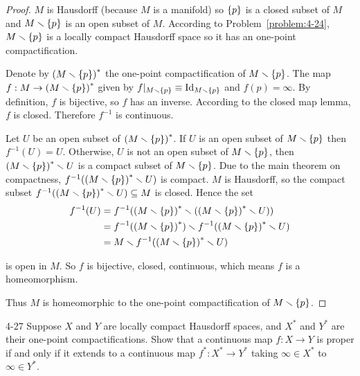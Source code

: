 \begin{proof}
	$M$ is Hausdorff (because $M$ is a manifold) so $\left\{{p}\right\}$ is a closed subset of $M$ and $M\smallsetminus \left\{{p}\right\}$ is an open subset of $M$. According to Problem~\ref{problem:4-24}, $M\smallsetminus \left\{{p}\right\}$ is a locally compact Hausdorff space so it has an one-point compactification.

	Denote by ${(M\smallsetminus \left\{{p}\right\})}^{*}$ the one-point compactification of $M\smallsetminus \left\{{p}\right\}$. The map $f: M \to {(M\smallsetminus \left\{{p}\right\})}^{*}$ given by $f\vert_{M\smallsetminus \left\{{p}\right\}} \equiv \operatorname{Id}_{M\smallsetminus \left\{{p}\right\}}$ and $f(p) = \infty$. By definition, $f$ is bijective, so $f$ has an inverse. According to the closed map lemma, $f$ is closed. Therefore $f^{-1}$ is continuous.

	Let $U$ be an open subset of ${(M\smallsetminus \left\{{p}\right\})}^{*}$. If $U$ is an open subset of $M\smallsetminus \left\{{p}\right\}$ then $f^{-1}(U) = U$. Otherwise, $U$ is not an open subset of $M\smallsetminus \left\{{p}\right\}$, then ${(M\smallsetminus \left\{{p}\right\})}^{*} \smallsetminus U$ is a compact subset of $M\smallsetminus \left\{{p}\right\}$. Due to the main theorem on compactness, $f^{-1}({(M\smallsetminus \left\{{p}\right\})}^{*} \smallsetminus U)$ is compact. $M$ is Hausdorff, so the compact subset $f^{-1}({(M\smallsetminus \left\{{p}\right\})}^{*} \smallsetminus U) \subseteq M$ is closed. Hence the set
	\begin{align*}
		f^{-1}(U) & = f^{-1}({(M\smallsetminus\left\{{p}\right\})}^{*} \smallsetminus ({(M\smallsetminus\left\{{p}\right\})}^{*} \smallsetminus U))       \\
		          & = f^{-1}({(M\smallsetminus\left\{{p}\right\})}^{*}) \smallsetminus f^{-1}({(M\smallsetminus\left\{{p}\right\})}^{*} \smallsetminus U) \\
		          & = M \smallsetminus f^{-1}({(M\smallsetminus\left\{{p}\right\})}^{*} \smallsetminus U)
	\end{align*}

	is open in $M$. So $f$ is bijective, closed, continuous, which means $f$ is a homeomorphism.

	Thus $M$ is homeomorphic to the one-point compactification of $M\smallsetminus \left\{{p}\right\}$.
\end{proof}

\begin{problem}{4-27}
Suppose $X$ and $Y$ are locally compact Hausdorff spaces, and $X^{*}$ and $Y^{*}$ are their one-point compactifications. Show that a continuous map $f: X\to Y$ is proper if and only if it extends to a continuous map $f^{*}: X^{*} \to Y^{*}$ taking $\infty \in X^{*}$ to $\infty \in Y^{*}$.
\end{problem}

